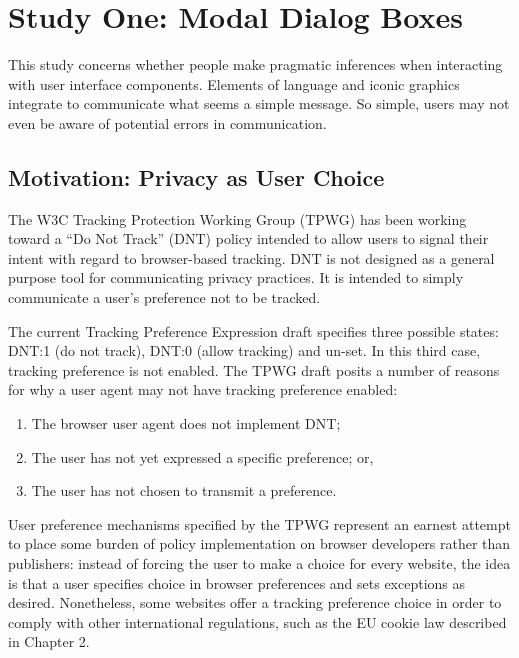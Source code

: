 \chapter{Study One: Modal Dialog Boxes}
\label{studyone:modaldialogboxes}

This study concerns whether people make pragmatic inferences when interacting with user interface components. Elements of language and iconic graphics integrate to communicate what seems a simple message. So simple, users may not even be aware of potential errors in communication.

\section{Motivation: Privacy as User Choice}
\label{motivation:privacyasuserchoice}

The W3C Tracking Protection Working Group (TPWG) has been working toward a ``Do Not Track'' (DNT) policy intended to allow users to signal their intent with regard to browser-based tracking. DNT is not designed as a general purpose tool for communicating privacy practices. It is intended to simply communicate a user's preference not to be tracked. 

The current Tracking Preference Expression draft specifies three possible states: DNT:1 (do not track), DNT:0 (allow tracking) and un-set. In this third case, tracking preference is not enabled. The TPWG draft posits a number of reasons for why a user agent may not have tracking preference enabled:
 
\begin{enumerate}
\item The browser user agent does not implement DNT;
\item The user has not yet expressed a specific preference; or,
\item The user has not chosen to transmit a preference.
\end{enumerate}

User preference mechanisms specified by the TPWG represent an earnest attempt to place some burden of policy implementation on browser developers rather than publishers: instead of forcing the user to make a choice for every website, the idea is that a user specifies choice in browser preferences and sets exceptions as desired. Nonetheless, some websites offer a tracking preference choice in order to comply with other international regulations, such as the EU cookie law described in Chapter 2.

